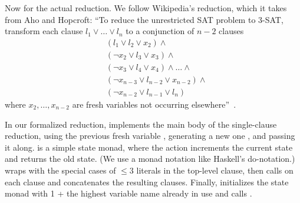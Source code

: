 \documentclass{article}
\begin{document}
Now for the actual reduction. We follow Wikipedia's reduction, which it takes
from Aho and Hopcroft: ``To reduce the unrestricted SAT problem to 3-SAT,
transform each clause $l_1 \lor \dots \lor l_n$ to a conjunction of $n - 2$
clauses
\begin{align*}
  &(l_1 \lor l_2 \lor x_2) \land \\
  &(\neg x_2 \lor l_3 \lor x_3) \land \\
  &(\neg x_3 \lor l_4 \lor x_4) \land \dots \land \\
  &(\neg x_{n-3} \lor l_{n-2} \lor x_{n-2}) \land \\
  &(\neg x_{n-2} \lor l_{n-1} \lor l_n)
\end{align*}
where $x_2, \dots, x_{n-2}$ are fresh variables not occurring
elsewhere''~\cite{wiki3sat,aho1974}.

In our formalized reduction,  implements the main body of the
single-clause reduction, using the previous fresh variable ,
generating a new one , and passing it along.  is a simple
state monad, where the action  increments the current state and
returns the old state. (We use a monad notation like Haskell's do-notation.)
 wraps  with the special cases of $\leq 3$
literals in the top-level clause, then  calls
 on each clause and concatenates the resulting clauses.
Finally,  initializes the state monad with 1 + the highest
variable name already in use and calls .
\end{document}
